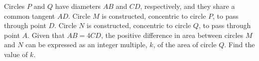 Circles $P$ and $Q$ have diameters $AB$ and $CD$, respectively, and they share a common tangent $AD$. Circle $M$ is constructed, concentric to circle $P$, to pass through point $D$. Circle $N$ is constructed, concentric to circle $Q$, to pass through point $A$. Given that $AB = 4CD$, the positive difference in area between circles $M$ and $N$ can be expressed as an integer multiple, $k$, of the area of circle $Q$. Find the value of $k$.
